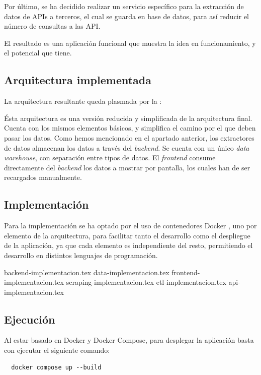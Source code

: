 Por último, se ha decidido realizar un servicio específico para la extracción de
datos de APIs a terceros, el cual se guarda en base de datos, para así reducir
el número de consultas a las API.

El resultado es una aplicación funcional que muestra la idea en funcionamiento,
y el potencial que tiene.



\subsection{Arquitectura implementada}
La arquitectura resultante queda plasmada por la :


Ésta arquitectura es una versión reducida y simplificada de la arquitectura 
final. Cuenta con los mismos elementos básicos, y simplifica el camino por el
que deben pasar los datos. Como hemos mencionado en el apartado anterior, los extractores de datos almacenan los datos a través del \textit{backend}. Se cuenta con un único \textit{data warehouse}, con separación entre tipos de datos. El \textit{frontend} consume directamente del \textit{backend} los datos
a mostrar por pantalla, los cuales han de ser recargados manualmente.



\subsection{Implementación}
Para la implementación se ha optado por el uso de contenedores Docker \cite{docker}, uno por
elemento de la arquitectura, para facilitar tanto el desarrollo como el
despliegue de la aplicación, ya que cada elemento es independiente del resto,
permitiendo el desarrollo en distintos lenguajes de programación.

{backend-implementacion.tex}
{data-implementacion.tex}
{frontend-implementacion.tex}
{scraping-implementacion.tex}
{etl-implementacion.tex}
{api-implementacion.tex}



\subsection{Ejecución}
Al estar basado en Docker y Docker Compose, para desplegar la aplicación basta
con ejecutar el siguiente comando:
\begin{verbatim}
  docker compose up --build
\end{verbatim}

